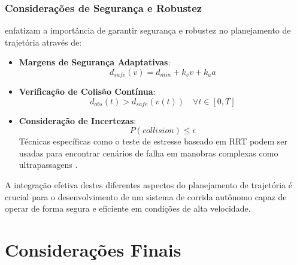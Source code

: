 \subsubsection{Considerações de Segurança e Robustez}

\cite{Ivanov2020Verifying} enfatizam a importância de garantir segurança e robustez no planejamento de trajetória através de:

\begin{itemize}
    \item \textbf{Margens de Segurança Adaptativas}:
          \begin{equation}
              d_{safe}(v) = d_{min} + k_v v + k_a a
          \end{equation}

    \item \textbf{Verificação de Colisão Contínua}:
          \begin{equation}
              d_{obs}(t) > d_{safe}(v(t)) \quad \forall t \in [0,T]
          \end{equation}

    \item \textbf{Consideração de Incertezas}:
          \begin{equation}
              P(collision) \leq \epsilon
          \end{equation}
          Técnicas específicas como o teste de estresse baseado em RRT podem ser usadas para encontrar cenários de falha em manobras complexas como ultrapassagens \cite{Bak2021Stress}.
\end{itemize}

A integração efetiva destes diferentes aspectos do planejamento de trajetória é
crucial para o desenvolvimento de um sistema de corrida autônomo capaz de
operar de forma segura e eficiente em condições de alta velocidade.

\section{Considerações Finais}

\lipsum[23]
